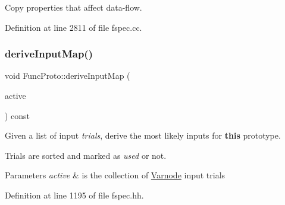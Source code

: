 Copy properties that affect data-\/flow. 



Definition at line 2811 of file fspec.\+cc.

\mbox{\label{class_func_proto_a06ef0c088573715372df24ef978bd610}} 
\subsubsection{\texorpdfstring{deriveInputMap()}{deriveInputMap()}}
{\footnotesize\ttfamily void Func\+Proto\+::derive\+Input\+Map (\begin{DoxyParamCaption}\item[{\mbox{\hyperlink{class_param_active}{Param\+Active}} $\ast$}]{active }\end{DoxyParamCaption}) const\hspace{0.3cm}{\ttfamily [inline]}}



Given a list of input {\itshape trials}, derive the most likely inputs for {\bfseries{this}} prototype. 

Trials are sorted and marked as {\itshape used} or not. 
\begin{DoxyParams}{Parameters}
{\em active} & is the collection of \mbox{\hyperlink{class_varnode}{Varnode}} input trials \\
\hline
\end{DoxyParams}


Definition at line 1195 of file fspec.\+hh.

